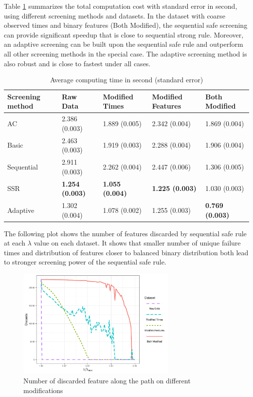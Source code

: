 Table \ref{Tab:realcox} summarizes the total computation cost with standard error in second, using different screening methods and datasets. In the dataset with coarse observed times and binary features (Both Modified), the sequential safe screening can provide significant speedup that is close to sequential strong rule. Moreover, an adaptive screening can be built upon the sequential safe rule and outperform all other screening methods in the special case. The adaptive screening method is also robust and is close to fastest under all cases.

\begin{table}[H]
\centering
\begin{tabular}{lllll}
\toprule
Screening method & Raw Data & Modified Times & Modified Features & Both Modified \\
\midrule
AC & 2.386 (0.003) & 1.889 (0.005) & 2.342 (0.004) & 1.869 (0.004) \\
Basic & 2.463 (0.003) & 1.919 (0.003) & 2.288 (0.004) & 1.906 (0.004) \\
Sequential & 2.911 (0.003) & 2.262 (0.004) & 2.447 (0.006) & 1.306 (0.005) \\
SSR & \textbf{1.254 (0.003)} & \textbf{1.055 (0.004)} & \textbf{1.225 (0.003)} & 1.030 (0.003) \\
Adaptive & 1.302 (0.004) & 1.078 (0.002) & 1.255 (0.003) & \textbf{0.769 (0.003)} \\
\bottomrule
\end{tabular}
\caption{Average computing time in second (standard error)}
\label{Tab:realcox}
\end{table}



The following plot shows the number of features discarded by sequential safe rule at each $\lambda$ value on each dataset. It shows that smaller number of unique failure times and distribution of features closer to balanced binary distribution both lead to stronger screening power of the sequential safe rule.

\begin{figure}[ht]
    \centering
    \includegraphics[width=0.7\textwidth]{shedden.pdf}    
    \caption{Number of discarded feature along the path on different modifications}
\end{figure}

